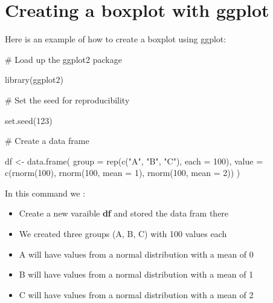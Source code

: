 \documentclass[
  letterpaper,
  DIV=11,
  numbers=noendperiod]{scrreprt}
\newenvironment{Shaded}{\begin{snugshade}}{\end{snugshade}}
\newcommand{\AttributeTok}[1]{\textcolor[rgb]{0.40,0.45,0.13}{#1}}
\newcommand{\CommentTok}[1]{\textcolor[rgb]{0.37,0.37,0.37}{#1}}
\newcommand{\DecValTok}[1]{\textcolor[rgb]{0.68,0.00,0.00}{#1}}
\newcommand{\FunctionTok}[1]{\textcolor[rgb]{0.28,0.35,0.67}{#1}}
\newcommand{\NormalTok}[1]{\textcolor[rgb]{0.00,0.23,0.31}{#1}}
\newcommand{\OtherTok}[1]{\textcolor[rgb]{0.00,0.23,0.31}{#1}}
\newcommand{\StringTok}[1]{\textcolor[rgb]{0.13,0.47,0.30}{#1}}
\providecommand{\tightlist}{%
  \setlength{\itemsep}{0pt}\setlength{\parskip}{0pt}}\usepackage{longtable,booktabs,array}
\begin{document}
\section*{Creating a boxplot with
ggplot}\label{creating-a-boxplot-with-ggplot}


Here is an example of how to create a boxplot using ggplot:

\begin{Shaded}
\begin{Highlighting}[]
\CommentTok{\# Load up the ggplot2 package}

\FunctionTok{library}\NormalTok{(ggplot2)}

\CommentTok{\# Set the seed for reproducibility}

\FunctionTok{set.seed}\NormalTok{(}\DecValTok{123}\NormalTok{)}

\CommentTok{\# Create a data frame}

\NormalTok{df }\OtherTok{\textless{}{-}} \FunctionTok{data.frame}\NormalTok{(}
  \AttributeTok{group =} \FunctionTok{rep}\NormalTok{(}\FunctionTok{c}\NormalTok{(}\StringTok{"A"}\NormalTok{, }\StringTok{"B"}\NormalTok{, }\StringTok{"C"}\NormalTok{), }\AttributeTok{each =} \DecValTok{100}\NormalTok{),}
  \AttributeTok{value =} \FunctionTok{c}\NormalTok{(}\FunctionTok{rnorm}\NormalTok{(}\DecValTok{100}\NormalTok{), }\FunctionTok{rnorm}\NormalTok{(}\DecValTok{100}\NormalTok{, }\AttributeTok{mean =} \DecValTok{1}\NormalTok{), }\FunctionTok{rnorm}\NormalTok{(}\DecValTok{100}\NormalTok{, }\AttributeTok{mean =} \DecValTok{2}\NormalTok{))}
\NormalTok{)}
\end{Highlighting}
\end{Shaded}

In this command we :

\begin{itemize}
\tightlist
\item
  Create a new varaible \textbf{df} and stored the data fram there
\item
  We created three groups (A, B, C) with 100 values each
\item
  A will have values from a normal distribution with a mean of 0
\item
  B will have values from a normal distribution with a mean of 1
\item
  C will have values from a normal distribution with a mean of 2
\end{itemize}
\end{document}
